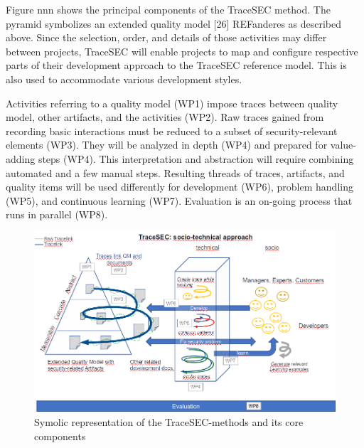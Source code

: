 
Figure nnn shows the principal components of the TraceSEC method. The pyramid symbolizes an extended quality model [26] REFanderes as described above. Since the selection, order, and details of those activities may differ between projects, TraceSEC will enable projects to map and configure respective parts of their development approach to the TraceSEC reference model. This is also used to accommodate various development styles.

Activities referring to a quality model (WP1) impose traces between quality model, other artifacts, and the activities (WP2). Raw traces gained from recording basic interactions must be reduced to a subset of security-relevant elements (WP3). They will be analyzed in depth (WP4) and prepared for value-adding steps (WP4). This interpretation and abstraction will require combining automated and a few manual steps. Resulting threads of traces, artifacts, and quality items will be used differently for development (WP6), problem handling (WP5), and continuous learning (WP7). Evaluation is an on-going process that runs in parallel (WP8).

\begin{figure} \centering
	\includegraphics[width=1.0\textwidth]{resources/work-plan}
	\caption{Symolic representation of the TraceSEC-methods and its core components}
	\label{fig:work-plan}
\end{figure}

